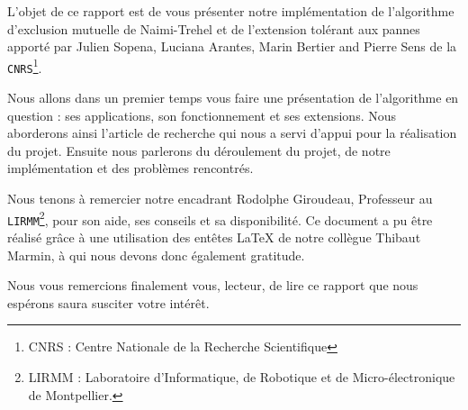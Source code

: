 L'objet de ce rapport est de vous présenter notre implémentation de l'algorithme d'exclusion mutuelle de Naimi-Trehel et de l'extension tolérant aux pannes apporté par \mbox{Julien} \mbox{Sopena}, \mbox{Luciana} \mbox{Arantes}, \mbox{Marin} \mbox{Bertier} and \mbox{Pierre} \mbox{Sens} de la \mbox{\texttt{CNRS}}\footnote{CNRS : Centre Nationale de la Recherche Scientifique}.

Nous allons dans un premier temps vous faire une présentation de l’algorithme en question : ses applications, son fonctionnement et ses extensions. Nous aborderons ainsi l’article de recherche qui nous a servi d’appui pour la réalisation du projet. Ensuite nous parlerons du déroulement du projet, de notre implémentation et des problèmes rencontrés.

Nous tenons à remercier notre encadrant \mbox{Rodolphe} \mbox{Giroudeau}, Professeur au \mbox{\texttt{LIRMM}}\footnote{LIRMM : Laboratoire d'Informatique, de Robotique et de Micro-électronique de Montpellier.}, pour son aide, ses conseils et sa disponibilité. Ce document a pu être réalisé grâce à 
une utilisation des entêtes \LaTeX{} de notre collègue \mbox{Thibaut} \mbox{Marmin}, à qui nous devons donc également gratitude. 

Nous vous remercions finalement vous, lecteur, de lire ce rapport que nous espérons saura susciter votre intérêt.